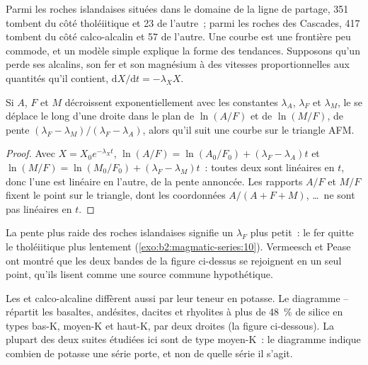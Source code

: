 Parmi les roches islandaises situées dans le domaine de la ligne de partage, 351 tombent du côté
tholéiitique et 23 de l'autre~; parmi les roches des Cascades, 417 tombent du côté calco-alcalin et 57
de l'autre. Une courbe est une frontière peu commode, et un modèle simple explique la forme des
tendances. Supposons qu'un  perde ses alcalins, son fer et son magnésium à des vitesses
proportionnelles aux quantités qu'il contient, $\mathrm dX/\mathrm dt = -\lambda_X X$.

\begin{proposition}\label{prop:b2:magmatic-series:logratio}
Si $A$, $F$ et $M$ décroissent exponentiellement avec les constantes $\lambda_A$, $\lambda_F$ et
$\lambda_M$, le  se déplace le long d'une droite dans le plan de $\ln(A/F)$ et de
$\ln(M/F)$, de pente $(\lambda_F - \lambda_M)/(\lambda_F - \lambda_A)$, alors qu'il suit une courbe
sur le triangle AFM.
\end{proposition}

\begin{proof}
Avec $X = X_0 e^{-\lambda_X t}$, $\ln(A/F) = \ln(A_0/F_0) + (\lambda_F - \lambda_A)t$
et $\ln(M/F) = \ln(M_0/F_0) + (\lambda_F - \lambda_M)t$~: toutes deux sont linéaires en $t$, donc
l'une est linéaire en l'autre, de la pente annoncée. Les rapports $A/F$ et $M/F$ fixent le
point sur le triangle, dont les coordonnées $A/(A + F + M)$, \dots\ ne sont pas linéaires en $t$.
\end{proof}

La pente plus raide des roches islandaises signifie un $\lambda_F$ plus petit~: le fer quitte
le  tholéiitique plus lentement (\cref{exo:b2:magmatic-series:10}). Vermeesch et Pease
ont montré que les deux bandes de la figure ci-dessus se rejoignent en un seul point, qu'ils
lisent comme une source commune hypothétique.

Les  et calco-alcaline diffèrent aussi par leur teneur en potasse. Le diagramme
-- répartit les basaltes, andésites, dacites et rhyolites à plus de \qty{48}{\percent} de silice
en types bas-K, moyen-K et haut-K, par deux droites (la figure ci-dessous). La plupart des deux
suites étudiées ici sont de type moyen-K~: le diagramme indique combien de potasse une série
porte, et non de quelle série il s'agit.

